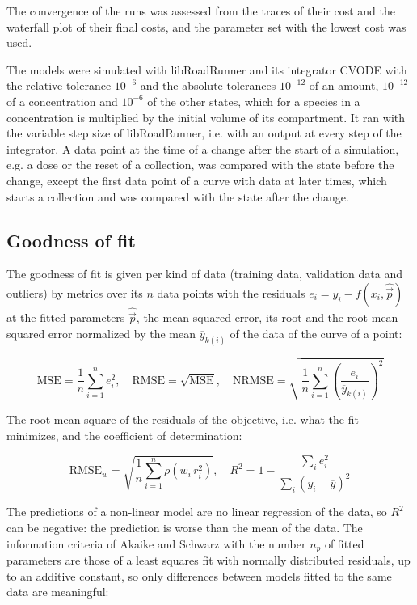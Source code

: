 \documentclass{article}
\begin{document}
The convergence of the runs was assessed from the traces of their cost and the waterfall plot of their final costs, and the parameter set with the lowest cost was used.

The models were simulated with libRoadRunner \cite{Welsh2023} and its integrator CVODE \cite{Hindmarsh2005} with the relative tolerance $10^{-6}$ and the absolute tolerances $10^{-12}$ of an amount, $10^{-12}$ of a concentration and $10^{-6}$ of the other states, which for a species in a concentration is multiplied by the initial volume of its compartment. It ran with the variable step size of libRoadRunner, i.e. with an output at every step of the integrator. A data point at the time of a change after the start of a simulation, e.g. a dose or the reset of a collection, was compared with the state before the change, except the first data point of a curve with data at later times, which starts a collection and was compared with the state after the change.

\subsection{Goodness of fit}

The goodness of fit is given per kind of data (training data, validation data and outliers) by metrics over its $n$ data points with the residuals $e_i = y_i - f(x_i, \hat{\vec{p}})$ at the fitted parameters $\hat{\vec{p}}$, the mean squared error, its root and the root mean squared error normalized by the mean $\overline{y}_{k(i)}$ of the data of the curve of a point:

\begin{equation}
\mathrm{MSE} = \frac{1}{n} \sum_{i=1}^{n} e_i^2, \quad \mathrm{RMSE} = \sqrt{\mathrm{MSE}}, \quad \mathrm{NRMSE} = \sqrt{\frac{1}{n} \sum_{i=1}^{n} \left(\frac{e_i}{\overline{y}_{k(i)}}\right)^2}
\end{equation}

The root mean square of the residuals of the objective, i.e. what the fit minimizes, and the coefficient of determination:

\begin{equation}
\mathrm{RMSE}_w = \sqrt{\frac{1}{n} \sum_{i=1}^{n} \rho\left(w_i\, r_i^2\right)}, \quad R^2 = 1 - \frac{\sum_{i} e_i^2}{\sum_{i} \left(y_i - \overline{y}\right)^2}
\end{equation}

The predictions of a non-linear model are no linear regression of the data, so $R^2$ can be negative: the prediction is worse than the mean of the data. The information criteria of Akaike \cite{Akaike1974} and Schwarz \cite{Schwarz1978} with the number $n_p$ of fitted parameters are those of a least squares fit with normally distributed residuals, up to an additive constant, so only differences between models fitted to the same data are meaningful:
\end{document}
